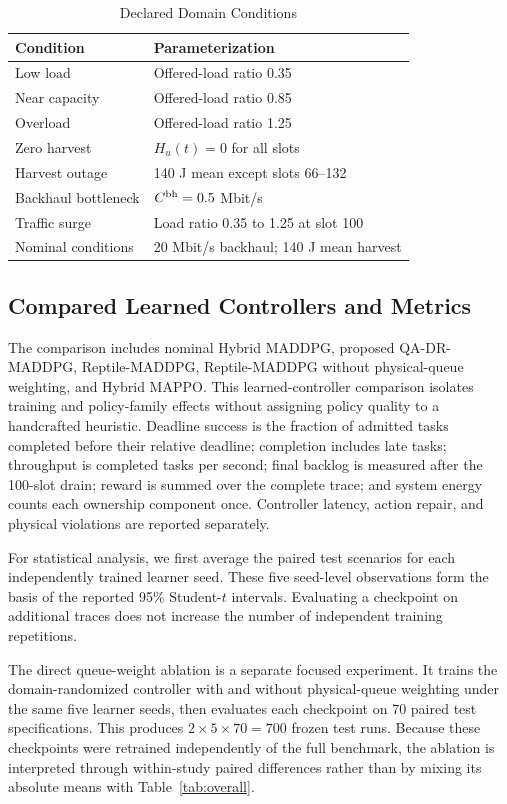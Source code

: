 \documentclass[journal]{IEEEtran}
\newcommand{\method}{QA-DR-MADDPG}
\begin{document}
\begin{table}[!t]
\caption{Declared Domain Conditions}
\label{tab:domains}
\centering
\footnotesize
\begin{tabular}{p{}p{}}
\toprule
Condition & Parameterization\\
\midrule
Low load & Offered-load ratio 0.35\\
Near capacity & Offered-load ratio 0.85\\
Overload & Offered-load ratio 1.25\\
Zero harvest & $H_u(t)=0$ for all slots\\
Harvest outage & 140 J mean except slots 66--132\\
Backhaul bottleneck & $C^{\rm bh}=0.5$ Mbit/s\\
Traffic surge & Load ratio 0.35 to 1.25 at slot 100\\
Nominal conditions & 20 Mbit/s backhaul; 140 J mean harvest\\
\bottomrule
\end{tabular}
\end{table}

\subsection{Compared Learned Controllers and Metrics}
The comparison includes nominal Hybrid MADDPG, proposed \method,
Reptile-MADDPG, Reptile-MADDPG without physical-queue weighting, and Hybrid
MAPPO. This learned-controller comparison isolates training and policy-family
effects without assigning policy quality to a handcrafted heuristic. Deadline
success is the fraction of admitted tasks completed before their relative
deadline; completion includes late tasks; throughput is completed tasks per
second; final backlog is measured after the 100-slot drain; reward is summed
over the complete trace; and system energy counts each ownership component
once. Controller latency, action repair, and physical violations are reported
separately.

For statistical analysis, we first average the paired test scenarios for
each independently trained learner seed. These five seed-level observations
form the basis of the reported 95\% Student-$t$ intervals. Evaluating a
checkpoint on additional traces does not increase the number of independent
training repetitions.

The direct queue-weight ablation is a separate focused experiment. It trains
the domain-randomized controller with and without physical-queue weighting
under the same five learner seeds, then evaluates each checkpoint on 70 paired
test specifications. This produces $2\times5\times70=700$ frozen test runs.
Because these checkpoints were retrained independently of the full benchmark,
the ablation is interpreted through within-study paired differences rather
than by mixing its absolute means with Table~\ref{tab:overall}.
\end{document}
